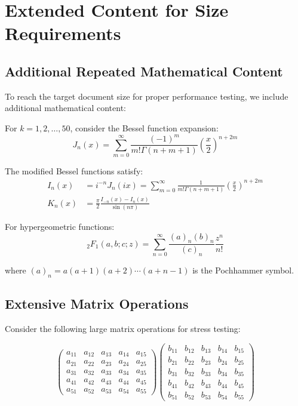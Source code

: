 \documentclass[12pt]{article}
\begin{document}
\section{Extended Content for Size Requirements}

\subsection{Additional Repeated Mathematical Content}

To reach the target document size for proper performance testing, we include additional mathematical content:

For $k = 1, 2, \ldots, 50$, consider the Bessel function expansion:
\begin{equation}
J_n(x) = \sum_{m=0}^{\infty} \frac{(-1)^m}{m! \Gamma(n+m+1)} \left(\frac{x}{2}\right)^{n+2m}
\end{equation}

The modified Bessel functions satisfy:
\begin{align}
I_n(x) &= i^{-n} J_n(ix) = \sum_{m=0}^{\infty} \frac{1}{m! \Gamma(n+m+1)} \left(\frac{x}{2}\right)^{n+2m} \\
K_n(x) &= \frac{\pi}{2} \frac{I_{-n}(x) - I_n(x)}{\sin(n\pi)}
\end{align}

For hypergeometric functions:
\begin{equation}
_2F_1(a,b;c;z) = \sum_{n=0}^{\infty} \frac{(a)_n (b)_n}{(c)_n} \frac{z^n}{n!}
\end{equation}

where $(a)_n = a(a+1)(a+2)\cdots(a+n-1)$ is the Pochhammer symbol.

\subsection{Extensive Matrix Operations}

Consider the following large matrix operations for stress testing:

\begin{equation}
\begin{pmatrix}
a_{11} & a_{12} & a_{13} & a_{14} & a_{15} \\
a_{21} & a_{22} & a_{23} & a_{24} & a_{25} \\
a_{31} & a_{32} & a_{33} & a_{34} & a_{35} \\
a_{41} & a_{42} & a_{43} & a_{44} & a_{45} \\
a_{51} & a_{52} & a_{53} & a_{54} & a_{55}
\end{pmatrix}
\begin{pmatrix}
b_{11} & b_{12} & b_{13} & b_{14} & b_{15} \\
b_{21} & b_{22} & b_{23} & b_{24} & b_{25} \\
b_{31} & b_{32} & b_{33} & b_{34} & b_{35} \\
b_{41} & b_{42} & b_{43} & b_{44} & b_{45} \\
b_{51} & b_{52} & b_{53} & b_{54} & b_{55}
\end{pmatrix}
\end{equation}
\end{document}
